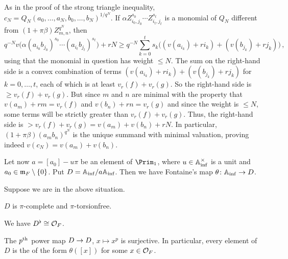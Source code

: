 \begin{proof*}
	As in the proof of the strong triangle inequality, $c_N=Q_N(a_0,\dotsc,a_N,b_0,\dotsc,b_N)^{1/q^N}$. If $\alpha Z_{i_0,j_0}^{s_0}\dotsm Z_{i_t,j_t}^{s_t}$ is a monomial of $Q_N$ different from $(1+\pi\beta)Z_{m,n}^{q^N}$, then
	\begin{equation*}
		q^{-N}v\big(\alpha (a_{i_0}b_{j_0})^{s_0}\dotsm (a_{i_t}b_{j_t})^{s_t}\big)+rN\geq q^{-N}\sum_{k=0}^ts_k\big((v(a_{i_k})+ri_k)+(v(b_{j_k})+rj_k)\big)\,,
	\end{equation*}
	using that the monomial in question has weight $\leq N$. The sum on the right-hand side is a convex combination of terms $(v(a_{i_k})+ri_k)+(v(b_{j_k})+rj_k)$ for $k=0,\dotsc,t$, each of which is at least $v_r(f)+v_r(g)$. So the right-hand side is $\geq v_r(f)+v_r(g)$. But since $m$ and $n$ are minimal with the property that $v(a_m)+rm=v_r(f)$ and $v(b_n)+rn=v_r(g)$ and since the weight is $\leq N$, some terms will be strictly greater than $v_r(f)+v_r(g)$. Thus, the right-hand side is $>v_r(f)+v_r(g)=v(a_m)+v(b_n)+rN$. In particular, $(1+\pi\beta)(a_mb_n)^{q^N}$ is the unique summand with minimal valuation, proving indeed $v(c_N)=v(a_m)+v(b_n)$.
\end{proof*}
Let now $a=[a_0]-u\pi$ be an element of $\Prim_1$, where $u\in\mathbb{A}_{\mathrm{inf}}^\times$ is a unit and $a_0\in\mathfrak{m}_F\setminus \{0\}$. Put $D=\mathbb{A}_{\mathrm{inf}}/a\mathbb{A}_{\mathrm{inf}}$. Then we have Fontaine's map $\theta\colon \IA_\inf\morphism D$.
\begin{prop}\label{prop:D}
	Suppose we are in the above situation.
	\begin{numerate}
		\item $D$ is $\pi$-complete and $\pi$-torsionfree.
		\item We have $D^\flat\cong \mathcal{O}_F$.
		\item The $p^{\text{th}}$ power map $D\morphism D$, $x\mapsto x^p$ is surjective. In particular, every element of $D$ is the of the form $\theta([x])$ for some $x\in\mathcal{O}_F$.
	\end{numerate}
\end{prop}
